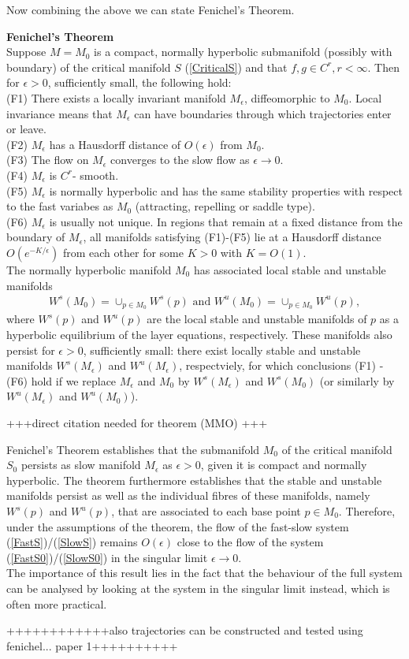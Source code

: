 Now combining the above we can state Fenichel's Theorem.
\begin{theorem}{\textbf{Fenichel's Theorem}} \label{Fenichel}
	\\
	Suppose $M=M_0$ is a compact, normally hyperbolic submanifold  (possibly with boundary) of the critical manifold $S$ (\ref{CriticalS}) and  that $f, g \in C^r, r < \infty $. Then for $\epsilon >0$, sufficiently small, the following hold:\\
	(F1) There exists a locally invariant manifold $M_{\epsilon}$, diffeomorphic to  $M_0$. Local invariance means that $M_{\epsilon}$ can have boundaries through which trajectories enter or leave.\\
	(F2) $M_{\epsilon}$ has a Hausdorff distance of $O(\epsilon)$ from $M_0$.\\
	(F3) The flow on $M_{\epsilon}$  converges to the slow flow as $\epsilon \to 0$.\\
	(F4) $M_{\epsilon}$ is $C^r$- smooth.\\
	(F5) $M_{\epsilon}$ is normally hyperbolic and has the same stability properties with respect to the fast variabes as $M_0$ (attracting, repelling or saddle type).\\
	(F6) $M_{\epsilon}$ is usually not unique. In regions that remain at a fixed distance from the boundary of  $M_{\epsilon}$, all manifolds satisfying (F1)-(F5) lie at a Hausdorff distance $O(e^{-K/\epsilon})$ from each other for some $K>0$ with $K=O(1)$.\\
	The normally hyperbolic manifold $M_0$ has associated local stable and unstable manifolds
	\begin{align*}
	W^s(M_0) =\cup_{p \in M_0} W^s(p) \textrm{\ \ and\ \ } W^u(M_0) =\cup_{p \in M_0} W^u(p),
	\end{align*}
	where  $W^s(p)$ and $W^u(p)$ are the local stable and unstable manifolds of $p$ as a hyperbolic equilibrium of the layer equations, respectively. These manifolds also persist for $\epsilon > 0$, sufficiently small: there exist locally stable and unstable manifolds $W^s(M_\epsilon)$ and $W^u(M_\epsilon)$, respectviely, for which conclusions (F1) - (F6) hold if we replace $M_\epsilon$ and $M_0$ by  $W^s(M_\epsilon)$ and $W^s(M_0)$ (or similarly by  $W^u(M_\epsilon)$ and $W^u(M_0)$).
\end{theorem} +++direct citation needed for theorem (MMO) +++

Fenichel's Theorem establishes that the submanifold $M_0$ of the critical manifold $S_0$ persists as slow manifold $M_\epsilon$ as $\epsilon >0$, given it is compact and normally hyperbolic. The theorem furthermore establishes that the stable and unstable manifolds persist as well as the individual fibres of these manifolds, namely $W^s(p)$ and $W^u(p)$, that are associated to each base point $p \in M_0$.
Therefore, under the assumptions of the theorem, the flow of the fast-slow system (\ref{FastS})/(\ref{SlowS}) remains $O(\epsilon)$ close to the flow of the system (\ref{FastS0})/(\ref{SlowS0}) in the singular limit $\epsilon \to 0$.
\\
The importance of this result lies in the fact that the behaviour of the full system can be analysed by looking at the system in the singular limit instead, which is often more practical.


++++++++++++also trajectories can be constructed and tested using fenichel... paper 1++++++++++


